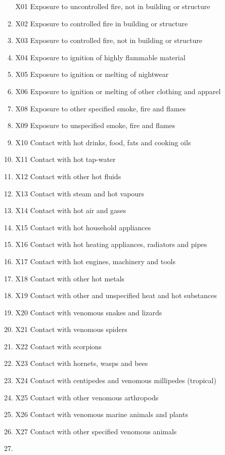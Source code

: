 \documentclass[
]{scrartcl}
\begin{document}
\begin{itemize}
\begin{enumerate}
    X01 Exposure to uncontrolled fire, not in building or structure
  \item
    X02 Exposure to controlled fire in building or structure
  \item
    X03 Exposure to controlled fire, not in building or structure
  \item
    X04 Exposure to ignition of highly flammable material
  \item
    X05 Exposure to ignition or melting of nightwear
  \item
    X06 Exposure to ignition or melting of other clothing and apparel
  \item
    X08 Exposure to other specified smoke, fire and flames
  \item
    X09 Exposure to unspecified smoke, fire and flames
  \item
    X10 Contact with hot drinks, food, fats and cooking oils
  \item
    X11 Contact with hot tap-water
  \item
    X12 Contact with other hot fluids
  \item
    X13 Contact with steam and hot vapours
  \item
    X14 Contact with hot air and gases
  \item
    X15 Contact with hot household appliances
  \item
    X16 Contact with hot heating appliances, radiators and pipes
  \item
    X17 Contact with hot engines, machinery and tools
  \item
    X18 Contact with other hot metals
  \item
    X19 Contact with other and unspecified heat and hot substances
  \item
    X20 Contact with venomous snakes and lizards
  \item
    X21 Contact with venomous spiders
  \item
    X22 Contact with scorpions
  \item
    X23 Contact with hornets, wasps and bees
  \item
    X24 Contact with centipedes and venomous millipedes (tropical)
  \item
    X25 Contact with other venomous arthropods
  \item
    X26 Contact with venomous marine animals and plants
  \item
    X27 Contact with other specified venomous animals
  \item

\end{enumerate}
\end{itemize}
\end{document}
